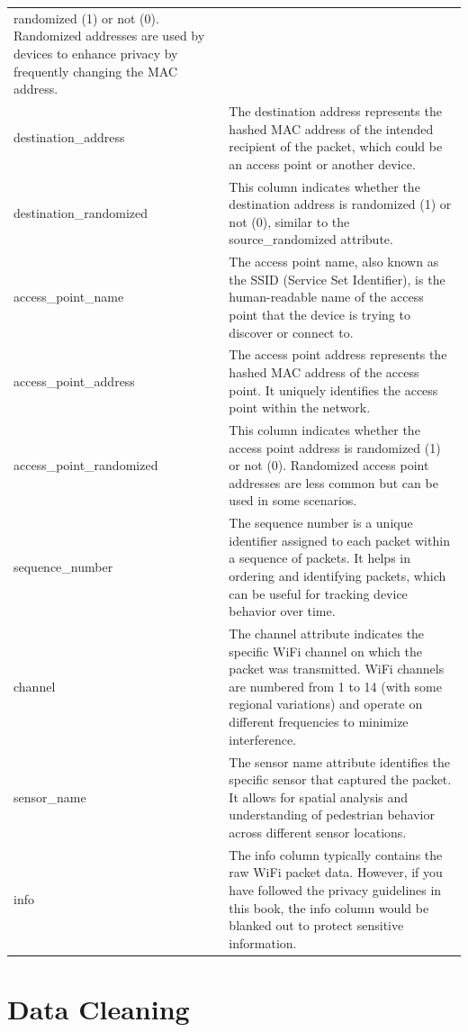 \documentclass[
  letterpaper,
]{scrbook}
\begin{document}
\begin{longtable}[]{@{}
  >{\raggedright\arraybackslash}p{}
  >{\raggedright\arraybackslash}p{}@{}}
randomized (1) or not (0). Randomized addresses are used by devices to
enhance privacy by frequently changing the MAC address. \\
destination\_address & The destination address represents the hashed MAC
address of the intended recipient of the packet, which could be an
access point or another device. \\
destination\_randomized & This column indicates whether the destination
address is randomized (1) or not (0), similar to the source\_randomized
attribute. \\
access\_point\_name & The access point name, also known as the SSID
(Service Set Identifier), is the human-readable name of the access point
that the device is trying to discover or connect to. \\
access\_point\_address & The access point address represents the hashed
MAC address of the access point. It uniquely identifies the access point
within the network. \\
access\_point\_randomized & This column indicates whether the access
point address is randomized (1) or not (0). Randomized access point
addresses are less common but can be used in some scenarios. \\
sequence\_number & The sequence number is a unique identifier assigned
to each packet within a sequence of packets. It helps in ordering and
identifying packets, which can be useful for tracking device behavior
over time. \\
channel & The channel attribute indicates the specific WiFi channel on
which the packet was transmitted. WiFi channels are numbered from 1 to
14 (with some regional variations) and operate on different frequencies
to minimize interference. \\
sensor\_name & The sensor name attribute identifies the specific sensor
that captured the packet. It allows for spatial analysis and
understanding of pedestrian behavior across different sensor
locations. \\
info & The info column typically contains the raw WiFi packet data.
However, if you have followed the privacy guidelines in this book, the
info column would be blanked out to protect sensitive information. \\
\end{longtable}

\hypertarget{data-cleaning}{%
\chapter{Data Cleaning}\label{data-cleaning}}
\end{document}
